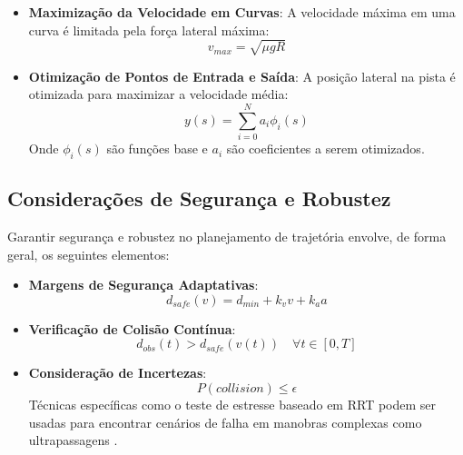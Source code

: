 \begin{itemize}
    \item \textbf{Maximização da Velocidade em Curvas}: A velocidade máxima em uma curva é limitada pela força lateral máxima:
          \begin{equation}
              v_{max} = \sqrt{\mu g R}
              \label{eq:max_cornering_speed}
          \end{equation}

    \item \textbf{Otimização de Pontos de Entrada e Saída}: A posição lateral na pista é otimizada para maximizar a velocidade média:
          \begin{equation}
              y(s) = \sum_{i=0}^N a_i \phi_i(s)
              \label{eq:racing_line_optimization}
          \end{equation}
          Onde $\phi_i(s)$ são funções base e $a_i$ são coeficientes a serem otimizados.
\end{itemize}

\subsection{Considerações de Segurança e Robustez}

Garantir segurança e robustez no planejamento de trajetória envolve, de forma geral, os seguintes elementos:

\begin{itemize}
    \item \textbf{Margens de Segurança Adaptativas}:
          \begin{equation}
              d_{safe}(v) = d_{min} + k_v v + k_a a
              \label{eq:adaptive_safety_margin}
          \end{equation}

    \item \textbf{Verificação de Colisão Contínua}:
          \begin{equation}
              d_{obs}(t) > d_{safe}(v(t)) \quad \forall t \in [0,T]
              \label{eq:collision_check}
          \end{equation}

    \item \textbf{Consideração de Incertezas}:
          \begin{equation}
              P(collision) \leq \epsilon
              \label{eq:collision_probability}
          \end{equation}
          Técnicas específicas como o teste de estresse baseado em RRT podem ser usadas para encontrar cenários de falha em manobras complexas como ultrapassagens \cite{Bak2021Stress}.
\end{itemize}

